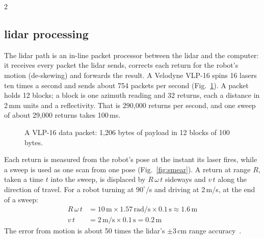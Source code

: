 \documentclass[10pt,letterpaper]{article}
\begin{document}
\begin{multicols}{2}
  \subsection{lidar processing}
  \label{sec:lidar}

  The lidar path is an in-line packet processor between the lidar and the computer: it receives every packet the lidar sends, corrects each return for the robot's motion (de-skewing) and forwards the result.
  A Velodyne VLP-16 spins 16 lasers ten times a second and sends about 754 packets per second (Fig.~\ref{fig:vlp}).
  A packet holds 12 blocks; a block is one azimuth reading and 32 returns, each a distance in 2\,mm units and a reflectivity.
  That is 290,000 returns per second, and one sweep of about 29,000 returns takes 100\,ms.

  \begin{figure}[H]
    \centering
    \caption{A VLP-16 data packet: 1,206 bytes of payload in 12 blocks of 100 bytes.}
    \label{fig:vlp}
  \end{figure}

  Each return is measured from the robot's pose at the instant its laser fires, while a sweep is used as one scan from one pose (Fig.~\ref{fig:smear}).
  A return at range $R$, taken a time $t$ into the sweep, is displaced by $R\,\omega\,t$ sideways and $v\,t$ along the direction of travel.
  For a robot turning at $90^\circ$/s and driving at 2\,m/s, at the end of a sweep:
  \begin{align*}
    R\,\omega\,t &= 10\,\text{m}\times1.57\,\text{rad/s}\times0.1\,\text{s}\approx 1.6\,\text{m}\\
    v\,t &= 2\,\text{m/s}\times0.1\,\text{s}=0.2\,\text{m}
  \end{align*}
  The error from motion is about 50 times the lidar's $\pm3$\,cm range accuracy~\cite{puck}.


\end{multicols}
\end{document}
